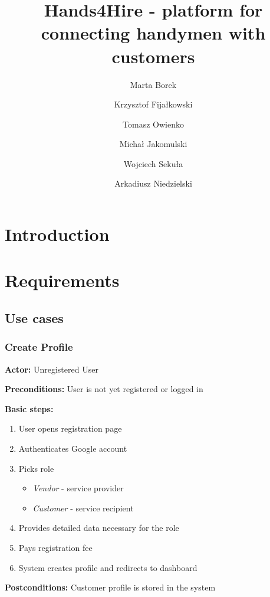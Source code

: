 \documentclass[11pt,a4paper]{article}
\title{Hands4Hire - platform for connecting handymen with customers}
\author{Marta Borek \and Krzysztof Fijałkowski \and Tomasz Owienko
\and Michał Jakomulski \and Wojciech Sekuła \and Arkadiusz Niedzielski}
\date{}
\begin{document}

\maketitle

\setcounter{tocdepth}{2}
\tableofcontents
\section{Introduction}

\section{Requirements}

\subsection{Use cases}

\subsubsection{Create Profile}

\textbf{Actor:} Unregistered User

\noindent \textbf{Preconditions:} User is not yet registered or logged in

\noindent \textbf{Basic steps:}
\begin{enumerate}[noitemsep]
  \item User opens registration page
  \item Authenticates Google account
  \item Picks role
    \begin{itemize}[noitemsep]
      \item \textit{Vendor} - service provider
      \item \textit{Customer} - service recipient
    \end{itemize}
  \item Provides detailed data necessary for the role
  \item Pays registration fee
  \item System creates profile and redirects to dashboard
\end{enumerate}

\noindent \textbf{Postconditions:} Customer profile is stored in the system
\end{document}
